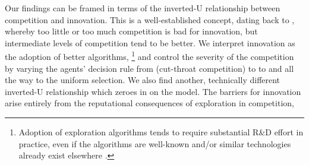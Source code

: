 Our findings can be framed in terms of the inverted-U relationship between competition and innovation. This is a well-established concept, dating back to \cite{Schumpeter-42}, whereby too little or too much competition is bad for innovation, but intermediate levels of competition tend to be better. %
We interpret innovation as the adoption of better algorithms,%
\footnote{Adoption of exploration algorithms tends to require substantial R\&D effort in practice, even if the algorithms are well-known and/or similar technologies already exist elsewhere  \citep[\eg see][]{DS-arxiv}.}
and control the severity of the competition by varying the agents' decision rule from \HardMax (cut-throat competition) to \HardMaxRandom to \SoftMaxRandom and all the way to the uniform selection. 
We also find another, technically different inverted-U relationship which zeroes in on the \HardMaxRandom model.
The barriers for innovation arise entirely from the reputational consequences of exploration in competition, 






